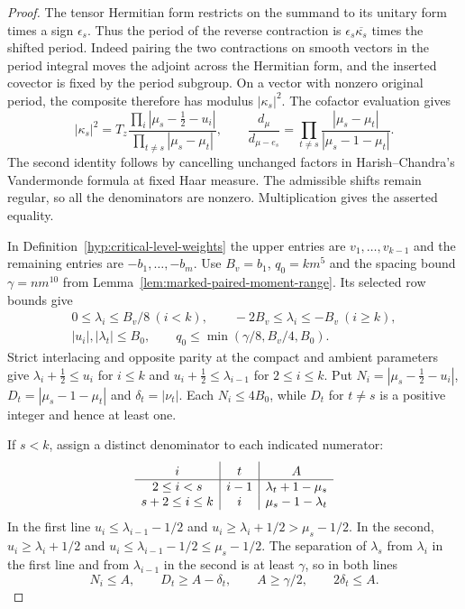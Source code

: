 \begin{proof}
The tensor Hermitian form restricts on the summand to its unitary
form times a sign \(\epsilon_s\). Thus the period of the reverse
contraction is \(\epsilon_s\overline{\kappa_s}\) times the shifted
period. Indeed pairing the two contractions on smooth vectors in
the period integral moves the adjoint across the Hermitian form,
and the inserted covector is fixed by the period subgroup.
On a vector with nonzero original period, the composite therefore
has modulus \(|\kappa_s|^2\). The cofactor evaluation gives
\[
 |\kappa_s|^2
 =T_z\frac{\prod_i|\mu_s-\tfrac12-u_i|}
              {\prod_{t\ne s}|\mu_s-\mu_t|},\qquad
 \frac{d_\mu}{d_{\mu-e_s}}
 =\prod_{t\ne s}\frac{|\mu_s-\mu_t|}{|\mu_s-1-\mu_t|}.
\]
The second identity follows by cancelling unchanged factors in
Harish--Chandra's Vandermonde formula at fixed Haar measure.
The admissible shifts remain regular, so all the denominators
are nonzero. Multiplication gives the asserted equality.

In Definition~\ref{hyp:critical-level-weights} the upper entries
are \(v_1,\ldots,v_{k-1}\) and the remaining entries are
\(-b_1,\ldots,-b_m\). Use \(B_v=b_1\), \(q_0=km^5\) and the
spacing bound \(\gamma=nm^{10}\) from
Lemma~\ref{lem:marked-paired-moment-range}. Its selected row bounds give
\[
 \begin{gathered}
  0\le\lambda_i\le B_v/8\ (i<k),\qquad
  -2B_v\le\lambda_i\le-B_v\ (i\ge k),\\
  |u_i|,|\lambda_t|\le B_0,\qquad
  q_0\le\min(\gamma/8,B_v/4,B_0).
 \end{gathered}
\]
Strict interlacing and opposite parity at the compact and ambient
parameters give \(\lambda_i+\tfrac12\le u_i\) for \(i\le k\)
and \(u_i+\tfrac12\le\lambda_{i-1}\) for \(2\le i\le k\).
Put \(N_i=|\mu_s-\tfrac12-u_i|\),
\(D_t=|\mu_s-1-\mu_t|\) and \(\delta_t=|\nu_t|\).
Each \(N_i\le4B_0\), while \(D_t\) for \(t\ne s\) is a positive
integer and hence at least one.

If \(s<k\), assign a distinct denominator to each indicated numerator:
\[
 \begin{array}{c|c|c}
   i&t&A\rule{0pt}{2.5ex}\\ \hline
   2\le i<s&i-1&\lambda_t+1-\mu_s\\
   s+2\le i\le k&i&\mu_s-1-\lambda_t
 \end{array}
\]
In the first line \(u_i\le\lambda_{i-1}-1/2\) and
\(u_i\ge\lambda_i+1/2>\mu_s-1/2\).
In the second, \(u_i\ge\lambda_i+1/2\) and
\(u_i\le\lambda_{i-1}-1/2\le\mu_s-1/2\).
The separation of \(\lambda_s\) from \(\lambda_i\) in the first
line and from \(\lambda_{i-1}\) in the second is at least
\(\gamma\), so in both lines
\[
 N_i\le A,\qquad D_t\ge A-\delta_t,\qquad
 A\ge\gamma/2,\qquad 2\delta_t\le A .
\]


\end{proof}
